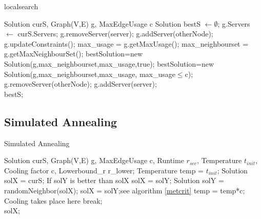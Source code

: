 \documentclass [12pt]{article}
\begin{document}
\begin {algorithm} [H]
\caption {localsearch}
\label {localS}
\begin {algorithmic} [3]
\Require Solution curS, Graph(V,E) g, MaxEdgeUsage c 
\State Solution bestS $\gets \emptyset$;
\State g.Servers $\gets$ curS.Servers;
  \State    g.removeServer(server);
      \State g.addServer(otherNode);
      \State g.updateConstraints();
      \State max\_usage = g.getMaxUsage();
      \State max\_neighbourset = g.getMaxNeighbourSet();
        \State bestSolution=new Solution(g,max\_neighbourset,max\_usage,true);
      \EndIf 
        \State bestSolution=new Solution(g,max\_neighbourset,max\_usage, max\_usage$\leq$c);
        \State g.removeServer(otherNode);
      \EndIf
      \EndIf
   \EndFor
   \State g.addServer(server);
\EndFor\\
    \Return  bestS;
\end {algorithmic}
\end {algorithm}

\subsection{Simulated Annealing}

\begin {algorithm} [H]
\caption {Simulated Annealing}
\label {simA}
\begin {algorithmic} [3]
\Require Solution curS, Graph(V,E) g, MaxEdgeUsage c, Runtime $r_{sec}$, Temperature $t_{init}$, Cooling factor c,
        Lowerbound\_r r\_lower; 
        \State Temperature temp = $t_{init}$;
        \State Solution solX = curS; 
         \Comment If solY is better than solX
                \State solX = solY;
         \Else
        \State Solution solY = randomNeighbor(solX);
                    \State solX = solY;\Comment see algorithm \ref{metcrit}
                \EndIf
        \EndIf    
            \State temp = temp*c; \Comment Cooling takes place here
               \State break;
            \EndIf 
      \EndWhile\\
      \Return solX;
\end {algorithmic}
\end {algorithm}
\end{document}
